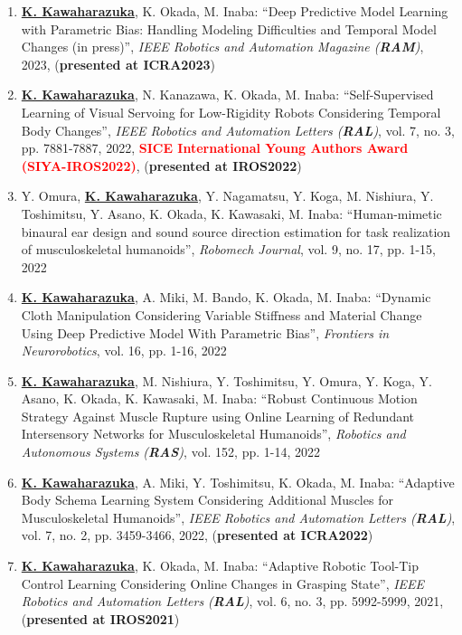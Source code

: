 \documentclass[letterpaper]{article}
\begin{document}
\begin{enumerate}
\item \underline{\textbf{K. Kawaharazuka}}, K. Okada, M. Inaba: ``Deep Predictive Model Learning with Parametric Bias: Handling Modeling Difficulties and Temporal Model Changes (in press)'', \textit{IEEE Robotics and Automation Magazine (\textit{\textbf{RAM}})}, 2023, (\textbf{presented at ICRA2023})
\item \underline{\textbf{K. Kawaharazuka}}, N. Kanazawa, K. Okada, M. Inaba: ``Self-Supervised Learning of Visual Servoing for Low-Rigidity Robots Considering Temporal Body Changes'', \textit{IEEE Robotics and Automation Letters (\textit{\textbf{RAL}})}, vol. 7, no. 3, pp. 7881-7887, 2022, \textbf{\textcolor{red}{SICE International Young Authors Award (SIYA-IROS2022)}}, (\textbf{presented at IROS2022})
\item Y. Omura, \underline{\textbf{K. Kawaharazuka}}, Y. Nagamatsu, Y. Koga, M. Nishiura, Y. Toshimitsu, Y. Asano, K. Okada, K. Kawasaki, M. Inaba: ``Human-mimetic binaural ear design and sound source direction estimation for task realization of musculoskeletal humanoids'', \textit{Robomech Journal}, vol. 9, no. 17, pp. 1-15, 2022
\item \underline{\textbf{K. Kawaharazuka}}, A. Miki, M. Bando, K. Okada, M. Inaba: ``Dynamic Cloth Manipulation Considering Variable Stiffness and Material Change Using Deep Predictive Model With Parametric Bias'', \textit{Frontiers in Neurorobotics}, vol. 16, pp. 1-16, 2022
\item \underline{\textbf{K. Kawaharazuka}}, M. Nishiura, Y. Toshimitsu, Y. Omura, Y. Koga, Y. Asano, K. Okada, K. Kawasaki, M. Inaba: ``Robust Continuous Motion Strategy Against Muscle Rupture using Online Learning of Redundant Intersensory Networks for Musculoskeletal Humanoids'', \textit{Robotics and Autonomous Systems (\textit{\textbf{RAS}})}, vol. 152, pp. 1-14, 2022
\item \underline{\textbf{K. Kawaharazuka}}, A. Miki, Y. Toshimitsu, K. Okada, M. Inaba: ``Adaptive Body Schema Learning System Considering Additional Muscles for Musculoskeletal Humanoids'', \textit{IEEE Robotics and Automation Letters (\textit{\textbf{RAL}})}, vol. 7, no. 2, pp. 3459-3466, 2022, (\textbf{presented at ICRA2022})
\item \underline{\textbf{K. Kawaharazuka}}, K. Okada, M. Inaba: ``Adaptive Robotic Tool-Tip Control Learning Considering Online Changes in Grasping State'', \textit{IEEE Robotics and Automation Letters (\textit{\textbf{RAL}})}, vol. 6, no. 3, pp. 5992-5999, 2021, (\textbf{presented at IROS2021})

\end{enumerate}
\end{document}
